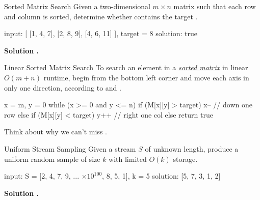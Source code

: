 \documentclass{cognito}
\begin{document}
\begin{note}{Sorted Matrix Search}
	Given a two-dimensional $m \times n$ matrix  such that each row and column is sorted,
	determine whether  contains the target .
	
	\begin{largecode}
 input: [ [1, 4, 7],
          [2, 8, 9],
          [4, 6, 11] ],  target = 8
 solution: true
	\end{largecode}
	\bf Solution \hyperref[note:Linear Sorted Matrix Search]{\solutionref}.
\end{note}

\begin{note}{Linear Sorted Matrix Search}
	To search an element in a \hyperref[note:Sorted Matrix Search]{\it sorted matrix} 
	in linear $O(m + n)$ runtime, begin from the bottom left corner and move each axis in
	only one direction, according to  and .
	
	\begin{largecode}
 x = m, y = 0
 while (x >= 0 and y <= n)
 	if (M[x][y] > target) x--       // down one row
	else if (M[x][y] < target) y++  // right one col
	else return true
	\end{largecode}
	\begin{remark}
		Think about why we can't miss .
	\end{remark}
	\vspace{-5pt}
\end{note}

\begin{note}{Uniform Stream Sampling}
	Given a stream $S$ of unknown length, produce a uniform random sample of size $k$
	with limited $O(k)$ storage.

	\begin{largecode}
 input: S = [2, 4, 7, 9, ... $\times 10^{100}$, 8, 5, 1], k = 5
 solution: [5, 7, 3, 1, 2]
	\end{largecode}
	\bf Solution \hyperref[note:Reservoir Sampling]{\solutionref}.
\end{note}
\end{document}
